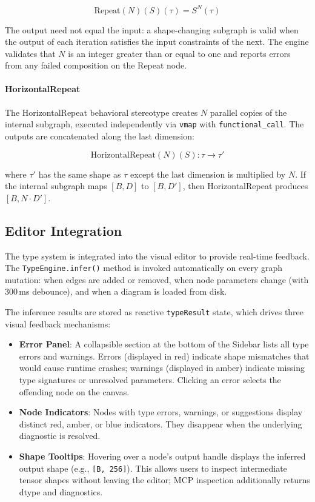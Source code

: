 \documentclass[11pt,a4paper]{article}
\begin{document}
\[
\text{Repeat}(N)(S)(\tau) = S^N(\tau)
\]

The output need not equal the input: a shape-changing subgraph is valid when the output of each iteration satisfies the input constraints of the next. The engine validates that $N$ is an integer greater than or equal to one and reports errors from any failed composition on the Repeat node.

\paragraph{HorizontalRepeat}

The HorizontalRepeat behavioral stereotype creates $N$ parallel copies of the internal subgraph, executed independently via \texttt{vmap} with \texttt{functional\_call}. The outputs are concatenated along the last dimension:

\[
\text{HorizontalRepeat}(N)(S) : \tau \rightarrow \tau'
\]

where $\tau'$ has the same shape as $\tau$ except the last dimension is multiplied by $N$. If the internal subgraph maps $[B, D]$ to $[B, D']$, then HorizontalRepeat produces $[B, N \cdot D']$.

\subsection{Editor Integration}

The type system is integrated into the visual editor to provide real-time feedback. The \texttt{TypeEngine.infer()} method is invoked automatically on every graph mutation: when edges are added or removed, when node parameters change (with 300\,ms debounce), and when a diagram is loaded from disk.

The inference results are stored as reactive \texttt{typeResult} state, which drives three visual feedback mechanisms:

\begin{itemize}
	\item \textbf{Error Panel}: A collapsible section at the bottom of the Sidebar lists all type errors and warnings. Errors (displayed in red) indicate shape mismatches that would cause runtime crashes; warnings (displayed in amber) indicate missing type signatures or unresolved parameters. Clicking an error selects the offending node on the canvas.
	\item \textbf{Node Indicators}: Nodes with type errors, warnings, or suggestions display distinct red, amber, or blue indicators. They disappear when the underlying diagnostic is resolved.
	\item \textbf{Shape Tooltips}: Hovering over a node's output handle displays the inferred output shape (e.g., \texttt{[B, 256]}). This allows users to inspect intermediate tensor shapes without leaving the editor; MCP inspection additionally returns dtype and diagnostics.
\end{itemize}
\end{document}
